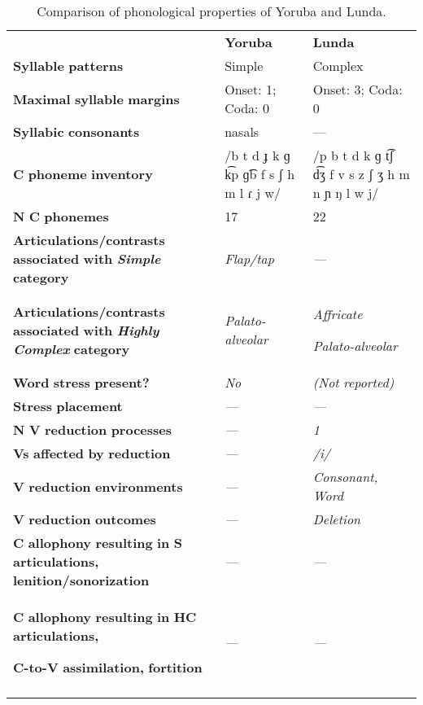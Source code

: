 \begin{table}
\begin{tabularx}{\textwidth}{XXX}
\lsptoprule
 & \textbf{Yoruba} & \textbf{Lunda}\\
 \textbf{Syllable} \textbf{patterns} & Simple & Complex\\
 \textbf{Maximal} \textbf{syllable} \textbf{margins} & Onset: 1; Coda: 0 & Onset: 3; Coda: 0\\
 \textbf{Syllabic} \textbf{consonants} & nasals & —\\
 \textbf{C} \textbf{phoneme} \textbf{inventory} & /b t d ɟ k ɡ k͡p ɡ͡b f s ʃ h m l ɾ j w/ & /p b t d k ɡ t͡ʃ d͡ʒ f v s z ʃ ʒ h m n ɲ ŋ l w j/\\
 \textbf{N} \textbf{C} \textbf{phonemes} & 17 & 22\\
 \textbf{Articulations/contrasts} \textbf{associated} \textbf{with} \textbf{\textit{Simple}} \textbf{category} & \textit{Flap/tap} & \textit{—}\\
 \textbf{Articulations/contrasts} \textbf{associated} \textbf{with} \textbf{\textit{Highly} \textit{Complex}} \textbf{category} & \textit{Palato-alveolar} & { \textit{Affricate}}

 \textit{Palato-alveolar}\\
 \textbf{Word} \textbf{stress} \textbf{present?} & \textit{No} & \textit{(Not} \textit{reported)}\\
 \textbf{Stress} \textbf{placement} & \textit{—} & \textit{—}\\
 \textbf{N} \textbf{V} \textbf{reduction} \textbf{processes} & \textit{—} & \textit{1}\\
 \textbf{Vs} \textbf{affected} \textbf{by} \textbf{reduction}  & \textit{—} & \textit{/i/}\\
 \textbf{V} \textbf{reduction} \textbf{environments} & \textit{—} & \textit{Consonant,} \textit{Word}\\
 \textbf{V} \textbf{reduction} \textbf{outcomes} & \textit{—} & \textit{Deletion}\\
 \textbf{C} \textbf{allophony} \textbf{resulting} \textbf{in} \textbf{S} \textbf{articulations,} \textbf{lenition/sonorization} & \textit{—} & \textit{—}\\
{ \textbf{C} \textbf{allophony} \textbf{resulting} \textbf{in} \textbf{HC} \textbf{articulations,} }

 \textbf{C-to-V} \textbf{assimilation,} \textbf{fortition} & \textit{—} & \textit{—}\\
\lspbottomrule
\end{tabularx}
\caption{\label{8.4}Comparison of phonological properties of Yoruba and Lunda.}
\end{table}




